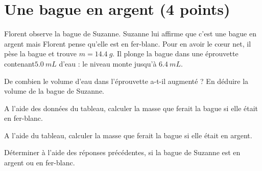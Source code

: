 \section{Une bague en argent (4 points)}\label{ex:bague}

Florent observe la bague de Suzanne. Suzanne lui affirme que c'est une bague en argent mais Florent pense qu'elle est en fer-blanc. Pour en avoir le c\oe ur net, il pèse la bague et trouve $m = \num{14.4} \ g$. Il plonge la bague dans une éprouvette contenant$ \num{5.0} \ mL$ d'eau : le niveau monte jusqu'à $\num{6.4} \ mL$.  

\begin{questions}
	\question[1] De combien le volume d'eau dans l'éprouvette a-t-il augmenté ? En déduire la volume de la bague de Suzanne.
	
	\question[1] A l'aide des données du tableau, calculer la masse que ferait la bague si elle était en fer-blanc.
	
	\question[1] A l'aide du tableau, calculer la masse que ferait la bague si elle était en argent.
	
	\question[1] Déterminer à l'aide des réponses précédentes, si la bague de Suzanne est en argent ou en fer-blanc.

\end{questions}

